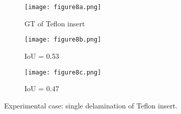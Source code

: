 \begin{sloppypar}
	
	\begin{figure} [!ht]
		\centering
		\begin{subfigure}[b]{0.32\textwidth}
			\centering
			\texttt{[image: figure8a.png]}
			\caption{GT of Teflon insert}
			\label{fig:exp_CFRP_teflon_3o_GT}
		\end{subfigure}
		\hfill
		\begin{subfigure}[b]{0.32\textwidth}
			\centering
			\texttt{[image: figure8b.png]}
			\caption{IoU = 0.53 } 
			\label{fig:model_1_CFRP_teflon_3o}
		\end{subfigure}
		\hfill
		\begin{subfigure}[b]{0.32\textwidth}
			\centering
			\texttt{[image: figure8c.png]}
			\caption{IoU = 0.47}
			\label{fig:model_2_CFRP_teflon_3o}
		\end{subfigure}
		\caption{Experimental case: single delamination of Teflon insert.}
		\label{fig:exp_Teflon_insert}
	\end{figure} 
	

\end{sloppypar}
